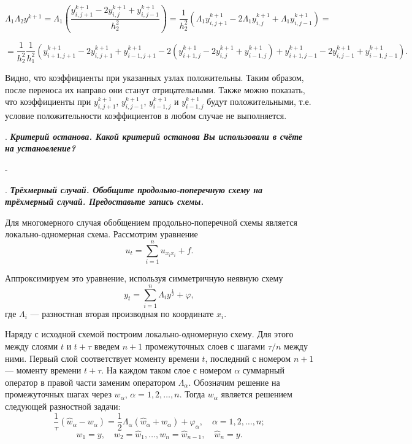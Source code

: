 \documentclass[12pt, a4paper]{article}
\newcounter{mycounter}
\newcommand{\quastion}[1]{%
	\stepcounter{mycounter}%
	\textbf{\themycounter}.  %
	\textbf{\textit{#1}}
	
}
\begin{document}
	\begin{equation*}
		\Lambda_1 \Lambda_2 y^{k+1} = \Lambda_1 \left(\frac{y^{k+1}_{i,j+1} - 2y^{k+1}_{i,j} + y^{k+1}_{i,j-1}}{h_2^2}\right) = \frac{1}{h_2^2} \left(\Lambda_1 y^{k+1}_{i,j+1} - 2\Lambda_1 y^{k+1}_{i,j} + \Lambda_1 y^{k+1}_{i,j-1}\right) =
	\end{equation*}
	
	\begin{equation*}
		= \frac{1}{h_2^2} \frac{1}{h_1^2} \left( y^{k+1}_{i+1,j+1} - 2y^{k+1}_{i,j+1} + y^{k+1}_{i-1,j+1} - 2(y^{k+1}_{i+1,j} - 2y^{k+1}_{i,j} + y^{k+1}_{i-1,j}) + y^{k+1}_{i+1,j-1} - 2y^{k+1}_{i,j-1} + y^{k+1}_{i-1,j-1} \right).
	\end{equation*}
	
	Видно, что коэффициенты при указанных узлах положительны. Таким образом, после переноса их направо они станут отрицательными. Также можно показать, что коэффициенты при $y^{k+1}_{i,j+1}$, $y^{k+1}_{i,j-1}$, $y^{k+1}_{i-1,j}$ и $y^{k+1}_{i-1,j}$ будут положительными, т.е. условие положительности коэффициентов в любом случае не выполняется.
	
	
	\bigskip
	\quastion{Критерий останова. Какой критерий останова Вы использовали в счёте на установление?}
	
	-
	
	
	
	\quastion{ Трёхмерный случай. Обобщите продольно-поперечную схему на трёхмерный случай. Предоставьте запись схемы.}
	Для многомерного случая обобщением продольно-поперечной схемы является локально-одномерная схема. Рассмотрим уравнение
	\begin{equation*}
		u_t = \sum_{i=1}^n u_{x_i x_i} + f.
	\end{equation*}
	
	Аппроксимируем это уравнение, используя симметричную неявную схему
	\begin{equation*}
		y_t = \sum_{i=1}^n \Lambda_i y^{\frac{1}{2}} + \varphi,
	\end{equation*}
	где $\Lambda_i$ — разностная вторая производная по координате $x_i$.
	
	Наряду с исходной схемой построим локально-одномерную схему. Для этого между слоями $t$ и $t + \tau$ введем $n+1$ промежуточных слоев с шагами $\tau/n$ между ними. Первый слой соответствует моменту времени $t$, последний с номером $n+1$ — моменту времени $t + \tau$. На каждом таком слое с номером $\alpha$ суммарный оператор в правой части заменим оператором $\Lambda_\alpha$. Обозначим решение на промежуточных шагах через $w_\alpha$, $\alpha = 1, 2, \ldots, n$. Тогда $w_\alpha$ является решением следующей разностной задачи:
	\begin{equation*}
		\frac{1}{\tau} (\hat{w}_\alpha - w_\alpha) = \frac{1}{2} \Lambda_\alpha (\hat{w}_\alpha + w_\alpha) + \varphi_\alpha, \quad \alpha = 1, 2, \ldots, n;
	\end{equation*}
	\begin{equation*}
		w_1 = y, \quad w_2 = \hat{w}_1, \ldots, w_n = \hat{w}_{n-1}, \quad \hat{w}_n = y.
	\end{equation*}
	
\end{document}
